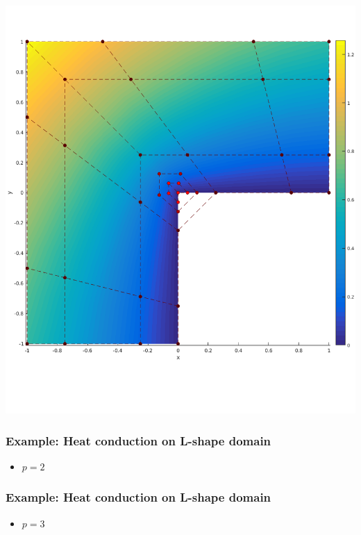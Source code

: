 \documentclass{beamer}
\begin{document}
\begin{frame}
\begin{minipage}{0.49\textwidth}
		\includegraphics[scale=0.24]{pics/lshape/lshape_controlnet_3.png}
	\end{minipage}
\end{frame}



\begin{frame}
	\frametitle{Example: Heat conduction on L-shape domain }%
	\begin{itemize}
		\item $ p=2 $
	\end{itemize}

	
\end{frame}

\begin{frame}
	\frametitle{Example: Heat conduction on L-shape domain }%
	\begin{itemize}
		\item $ p=3 $
	\end{itemize}
	
	
\end{frame}
\end{document}
